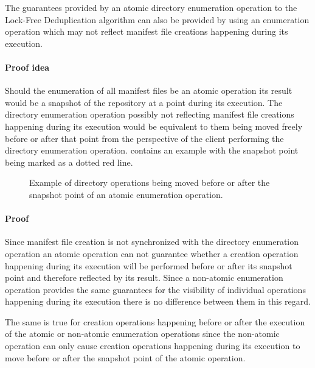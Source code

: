 \begin{thm}\label{thm:nonatomic-listing}
    The guarantees provided by an atomic directory enumeration operation to the
    Lock-Free Deduplication algorithm can also be provided by using an enumeration
    operation which may not reflect manifest file creations happening during its execution.
\end{thm}

\paragraph{Proof idea} Should the enumeration of all manifest files be an atomic
operation its result would be a snapshot of the repository at a point during
its execution.
The directory enumeration operation possibly not reflecting manifest file creations
happening during its execution would be equivalent to them being moved freely before or
after that point from the perspective of the client performing the directory
enumeration operation.
 contains an example with the snapshot point being marked
as a dotted red line.

\begin{figure}[H]
    
    \caption{Example of directory operations being moved before or after the snapshot point of an atomic enumeration operation.}\label{fig:listing-proof-idea}
\end{figure}

\paragraph{Proof} Since manifest file creation is not synchronized with the
directory enumeration operation an atomic operation can not guarantee
whether a creation operation happening during its execution will be performed
before or after its snapshot point and therefore reflected by its result.
Since a non-atomic enumeration operation provides the same guarantees for
the visibility of individual operations happening during its execution there
is no difference between them in this regard.

The same is true for creation operations happening before or after the execution
of the atomic or non-atomic enumeration operations since the non-atomic operation
can only cause creation operations happening during its execution to move before
or after the snapshot point of the atomic operation.

